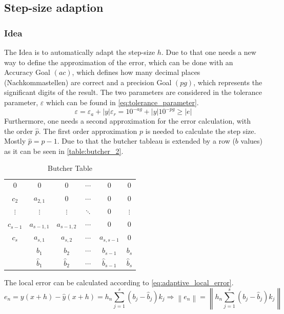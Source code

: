 \subsection{Step-size adaption}
\subsubsection{Idea}
The Idea is to automatically adapt the step-size $h$. Due to that one needs a new way to define the approximation of the error, which can be done with an Accuracy Goal $(ac)$, which defines how many decimal places (Nachkommastellen) are correct and a precision Goal $(pg)$, which represents the significant digits of the result. The two parameters are considered in the tolerance parameter, $\varepsilon$ which can be found in \autoref{eq:tolerance_parameter}.
\begin{equation}\label{eq:tolerance_parameter}
    \varepsilon=\varepsilon_{a}+|y| \varepsilon_{r}=10^{-a g}+|y| 10^{-p g} \geq|e|
\end{equation}
Furthermore, one needs a second approximation for the error calculation, with the order $\hat{p}$. The first order approximation $p$ is needed to calculate the step size. Mostly $\hat{p}=p-1$. Due to that the butcher tableau is extended by a row ($b$ values) as it can be seen in \autoref{table:butcher_2}.
\begin{table}[ht]
\centering
\begin{tabular}{|c|ccccc|}
\hline 0 & 0 & 0 & $\cdots$ & 0 & 0 \\
$c_{2}$ & $a_{2,1}$ & 0 & $\cdots$ & 0 & 0 \\
$\vdots$ & $\vdots$ & $\vdots$ & $\ddots$ & 0 & $\vdots$ \\
$c_{s-1}$ & $a_{s-1,1}$ & $a_{s-1,2}$ & $\cdots$ & 0 & 0 \\
$c_{s}$ & $a_{s, 1}$ & $a_{s, 2}$ & $\cdots$ & $a_{s, s-1}$ & 0 \\
\hline & $b_{1}$ & $b_{2}$ & $\cdots$ & $b_{s-1}$ & $b_{s}$ \\
& $\hat{b}_{1}$ & $\hat{b}_{2}$ & $\cdots$ & $\hat{b}_{s-1}$ & $\hat{b}_{s}$ \\
\hline
\end{tabular}
\caption{Butcher Table}
\label{table:butcher_2}
\end{table}
The local error can be calculated according to \autoref{eq:adaptive_local_error}.
\begin{equation}\label{eq:adaptive_local_error}
    e_{n}=y(x+h)-\hat{y}(x+h)=h_{n} \sum_{j=1}^{s}\left(b_{j}-\hat{b}_{j}\right) k_{j} \Rightarrow\left\|e_{n}\right\|=\left\|h_{n} \sum_{j=1}^{s}\left(b_{j}-\hat{b}_{j}\right) k_{j}\right\|
\end{equation}
